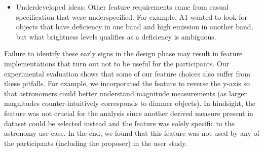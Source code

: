 {\begin{itemize}
\item Underdeveloped ideas: Other feature requirements came from casual specification that were underspecified. For example, A1 wanted to look for objects that have deficiency in one band and high emission in another band, but what brightness levels qualifies as a deficiency is ambiguous.
\end{itemize}
\par Failure to identify these early signs in the design phase may result in feature implementations that turn out not to be useful for the participants. 
Our experimental evaluation shows that some of our feature choices also suffer from these pitfalls. For example, we incorporated the feature to reverse the y-axis so that astronomers could better understand magnitude measurements (as larger magnitudes counter-intuitively corresponds to dimmer objects). In hindsight, the feature was not crucial for the analysis since another derived measure present in dataset could be selected instead and the feature was solely specific to the astronomy use case. In the end, we found that this feature was not used by any of the participants (including the proposer) in the user study.%
}